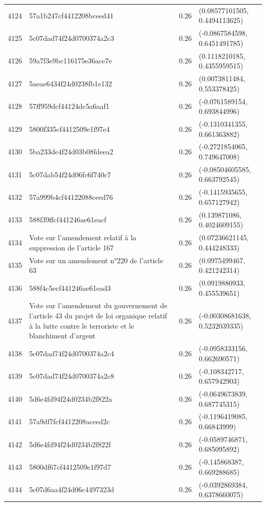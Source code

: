 \begin{table}[ht]
\begin{tabular}{rlrl}
  4124 & 57a1b247cf4412208bceed41 & 0.26 & (0.08577101505, 0.4494113625) \\ 
  4125 & 5c07dad74f24d0700374a2c3 & 0.26 & (-0.0867584598, 0.6451491785) \\ 
  4126 & 59a7f3e9bc116175e36ace7e & 0.26 & (0.1118210185, 0.4355959515) \\ 
  4127 & 5aeae6434f24d0238fb1e132 & 0.26 & (0.0073811484, 0.553378425) \\ 
  4128 & 57ff959dcf44124dc5a6aaf1 & 0.26 & (-0.0761589154, 0.693844996) \\ 
  4129 & 5800f335cf4412509e1f97e4 & 0.26 & (-0.1310341355, 0.661363882) \\ 
  4130 & 5ba233de4f24d03b08fdeea2 & 0.26 & (-0.2721854065, 0.749647008) \\ 
  4131 & 5c07dab54f24d06fc6f740c7 & 0.26 & (-0.08504605585, 0.663792545) \\ 
  4132 & 57a999b4cf44122088ceed76 & 0.26 & (-0.1415935655, 0.657127942) \\ 
  4133 & 588f39ffcf441246ae61eacf & 0.26 & (0.139871086, 0.4024609155) \\ 
  4134 & Vote sur l'amendement relatif à la suppression de l'article 167 & 0.26 & (0.07236621145, 0.444248333) \\ 
  4135 & Vote sur un amendement n°220 de l'article 63 & 0.26 & (0.0975499467, 0.421242314) \\ 
  4136 & 588f4c5ecf441246ae61ead3 & 0.26 & (0.0919880933, 0.455539651) \\ 
  4137 & Vote sur l'amendement du gouvernement de l'article 43 du projet de loi organique relatif à la lutte contre le terroriste et le blanchiment d'argent & 0.26 & (-0.00308681638, 0.5232039335) \\ 
  4138 & 5c07dad74f24d0700374a2c4 & 0.26 & (-0.0958333156, 0.662690571) \\ 
  4139 & 5c07dad74f24d0700374a2c8 & 0.26 & (-0.108342717, 0.657942903) \\ 
  4140 & 5d6e4fd94f24d0234b2f822a & 0.26 & (-0.0649673839, 0.687745315) \\ 
  4141 & 57a9df7fcf4412208aceed2c & 0.26 & (-0.1196419085, 0.66843999) \\ 
  4142 & 5d6e4fd94f24d0234b2f822f & 0.26 & (-0.0589746871, 0.685095892) \\ 
  4143 & 5800df67cf4412509e1f97d7 & 0.26 & (-0.145868387, 0.669288685) \\ 
  4144 & 5c07d6aa4f24d06c4497323d & 0.26 & (-0.0392869384, 0.6378660075) \\ 

\end{tabular}
\end{table}
